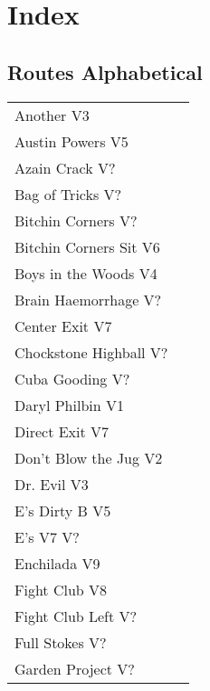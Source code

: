 \chapter{Index}
\lhead{\textcolor{\chapterColor}{\rule[-2pt]{\textwidth}{15pt}}}
\section{Routes Alphabetical}
\begin{center}
\begin{supertabular}{lr}
Another V3 & \pageref{rt:Another} \\
Austin Powers V5 & \pageref{rt:Austin Powers} \\
Azain Crack V? & \pageref{rt:Azain Crack} \\
Bag of Tricks V? & \pageref{rt:Bag of Tricks} \\
Bitchin Corners V? & \pageref{rt:Bitchin Corners} \\
Bitchin Corners Sit V6 & \pageref{vr:Bitchin Corners Sit} \\
Boys in the Woods V4 & \pageref{rt:Boys in the Woods} \\
Brain Haemorrhage V? & \pageref{rt:Brain Haemorrhage} \\
Center Exit V7 & \pageref{vr:Center Exit} \\
Chockstone Highball V? & \pageref{rt:Chockstone Highball} \\
Cuba Gooding V? & \pageref{rt:Cuba Gooding} \\
Daryl Philbin V1 & \pageref{rt:Daryl Philbin} \\
Direct Exit V7 & \pageref{vr:Direct Exit} \\
Don't Blow the Jug V2 & \pageref{rt:Don't Blow the Jug} \\
Dr. Evil V3 & \pageref{rt:Dr. Evil} \\
E's Dirty B V5 & \pageref{rt:E's Dirty B} \\
E's V7 V? & \pageref{rt:E's V7} \\
Enchilada V9 & \pageref{rt:Enchilada} \\
Fight Club V8 & \pageref{rt:Fight Club} \\
Fight Club Left V? & \pageref{rt:Fight Club Left} \\
Full Stokes V? & \pageref{rt:Full Stokes} \\
Garden Project V? & \pageref{rt:Garden Project} \\

\end{supertabular}
\end{center}
